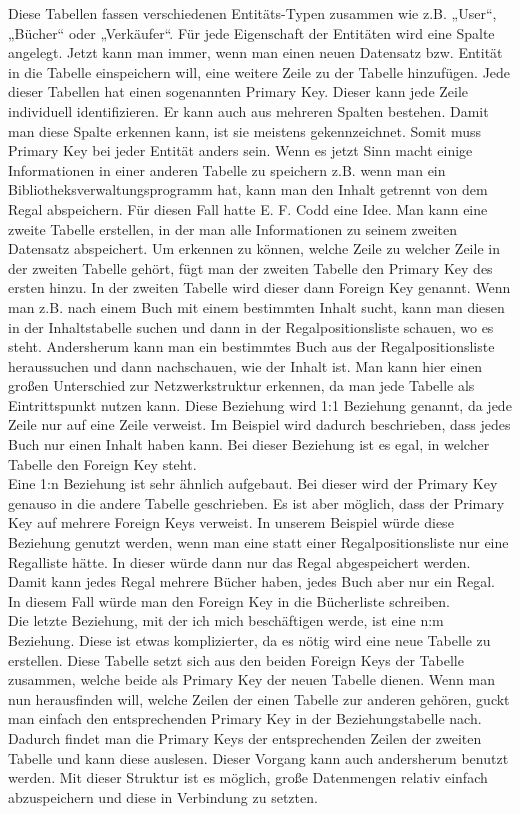 \documentclass[a4paper, 12pt]{article}
\theoremstyle{plain}
\theoremstyle{definition}
\begin{document}
Diese Tabellen fassen verschiedenen Entitäts-Typen zusammen wie z.B. „User“, „Bücher“ oder „Verkäufer“. Für jede Eigenschaft der Entitäten wird eine Spalte angelegt. Jetzt kann man immer, wenn man einen neuen Datensatz bzw. Entität in die Tabelle einspeichern will, eine weitere Zeile zu der Tabelle hinzufügen. Jede dieser Tabellen hat einen sogenannten Primary Key. Dieser kann jede Zeile individuell identifizieren. Er kann auch aus mehreren Spalten bestehen. Damit man diese Spalte erkennen kann, ist sie meistens gekennzeichnet. Somit muss Primary Key bei jeder Entität anders sein. Wenn es jetzt Sinn macht einige Informationen in einer anderen Tabelle zu speichern z.B. wenn man ein Bibliotheksverwaltungsprogramm hat, kann man den Inhalt getrennt von dem Regal abspeichern. Für diesen Fall hatte E. F. Codd eine Idee. Man kann eine zweite Tabelle erstellen, in der man alle Informationen zu seinem zweiten Datensatz abspeichert. Um erkennen zu können, welche Zeile zu welcher Zeile in der zweiten Tabelle gehört, fügt man der zweiten Tabelle den Primary Key des ersten hinzu. In der zweiten Tabelle wird dieser dann Foreign Key genannt. Wenn man z.B. nach einem Buch mit einem bestimmten Inhalt sucht, kann man diesen in der Inhaltstabelle suchen und dann in der Regalpositionsliste schauen, wo es steht. Andersherum kann man ein bestimmtes Buch aus der Regalpositionsliste heraussuchen und dann nachschauen, wie der Inhalt ist. Man kann hier einen großen Unterschied zur Netzwerkstruktur erkennen, da man jede Tabelle als Eintrittspunkt nutzen kann. Diese Beziehung wird 1:1 Beziehung genannt, da jede Zeile nur auf eine Zeile verweist. Im Beispiel wird dadurch beschrieben, dass jedes Buch nur einen Inhalt haben kann. Bei dieser Beziehung ist es egal, in welcher Tabelle den Foreign Key steht.\\
Eine 1:n Beziehung ist sehr ähnlich aufgebaut. Bei dieser wird der Primary Key genauso in die andere Tabelle geschrieben. Es ist aber möglich, dass der Primary Key auf mehrere Foreign Keys verweist. In unserem Beispiel würde diese Beziehung genutzt werden, wenn man eine statt einer Regalpositionsliste nur eine Regalliste hätte. In dieser würde dann nur das Regal abgespeichert werden. Damit kann jedes Regal mehrere Bücher haben, jedes Buch aber nur ein Regal. In diesem Fall würde man den Foreign Key in die Bücherliste schreiben.\\
Die letzte Beziehung, mit der ich mich beschäftigen werde, ist eine n:m Beziehung. Diese ist etwas komplizierter, da es nötig wird eine neue Tabelle zu erstellen. Diese Tabelle setzt sich aus den beiden Foreign Keys der Tabelle zusammen, welche beide als Primary Key der neuen Tabelle dienen. Wenn man nun herausfinden will, welche Zeilen der einen Tabelle zur anderen gehören, guckt man einfach den entsprechenden Primary Key in der Beziehungstabelle nach. Dadurch findet man die Primary Keys der entsprechenden Zeilen der zweiten Tabelle und kann diese auslesen. Dieser Vorgang kann auch andersherum benutzt werden. Mit dieser Struktur ist es möglich, große Datenmengen relativ einfach abzuspeichern und diese in Verbindung zu setzten.
\end{document}
